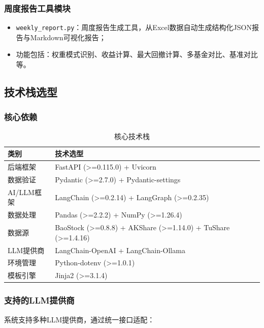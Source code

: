 \documentclass[12pt,a4paper]{ctexart}
\begin{document}
\subsubsection{周度报告工具模块}

\begin{itemize}
    \item \texttt{weekly\_report.py}：周度报告生成工具，从Excel数据自动生成结构化JSON报告与Markdown可视化报告；
    \item 功能包括：权重模式识别、收益计算、最大回撤计算、多基金对比、基准对比等。
\end{itemize}

\subsection{技术栈选型}

\subsubsection{核心依赖}

\begin{table}[H]
    \centering
    \caption{核心技术栈}
    \begin{tabular}{ll}
        \toprule
        \textbf{类别} & \textbf{技术选型} \\
        \midrule
        后端框架 & FastAPI (>=0.115.0) + Uvicorn \\
        数据验证 & Pydantic (>=2.7.0) + Pydantic-settings \\
        AI/LLM框架 & LangChain (>=0.2.14) + LangGraph (>=0.2.35) \\
        数据处理 & Pandas (>=2.2.2) + NumPy (>=1.26.4) \\
        数据源 & BaoStock (>=0.8.8) + AKShare (>=1.14.0) + TuShare (>=1.4.16) \\
        LLM提供商 & LangChain-OpenAI + LangChain-Ollama \\
        环境管理 & Python-dotenv (>=1.0.1) \\
        模板引擎 & Jinja2 (>=3.1.4) \\
        \bottomrule
    \end{tabular}
\end{table}

\subsubsection{支持的LLM提供商}

系统支持多种LLM提供商，通过统一接口适配：
\end{document}
